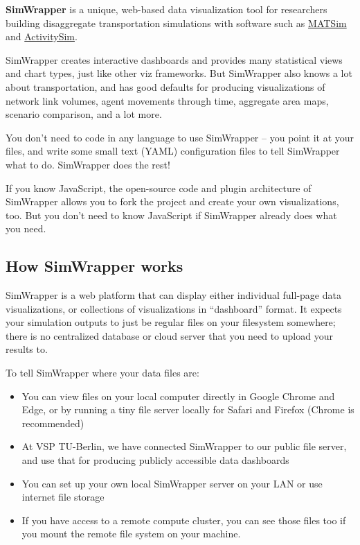 \textbf{SimWrapper} is a unique, web-based data visualization tool for
researchers building disaggregate transportation simulations with
software such as \href{https://matsim.org}{MATSim} and
\href{https://activitysim.github.io}{ActivitySim}.

SimWrapper creates interactive dashboards and provides many statistical
views and chart types, just like other viz frameworks. But SimWrapper
also knows a lot about transportation, and has good defaults for
producing visualizations of network link volumes, agent movements
through time, aggregate area maps, scenario comparison, and a lot more.

You don't need to code in any language to use SimWrapper -- you point it
at your files, and write some small text (YAML) configuration files to
tell SimWrapper what to do. SimWrapper does the rest!

If you know JavaScript, the open-source code and plugin architecture of
SimWrapper allows you to fork the project and create your own
visualizations, too. But you don't need to know JavaScript if SimWrapper
already does what you need.

\hypertarget{how-simwrapper-works}{%
\subsection{How SimWrapper works}\label{how-simwrapper-works}}

SimWrapper is a web platform that can display either individual
full-page data visualizations, or collections of visualizations in
``dashboard'' format. It expects your simulation outputs to just be
regular files on your filesystem somewhere; there is no centralized
database or cloud server that you need to upload your results to.

To tell SimWrapper where your data files are:

\begin{itemize}
\tightlist
\item
  You can view files on your local computer directly in Google Chrome
  and Edge, or by running a tiny file server locally for Safari and
  Firefox (Chrome is recommended)
\item
  At VSP TU-Berlin, we have connected SimWrapper to our public file
  server, and use that for producing publicly accessible data dashboards
\item
  You can set up your own local SimWrapper server on your LAN or use
  internet file storage
\item
  If you have access to a remote compute cluster, you can see those
  files too if you mount the remote file system on your machine.
\end{itemize}

